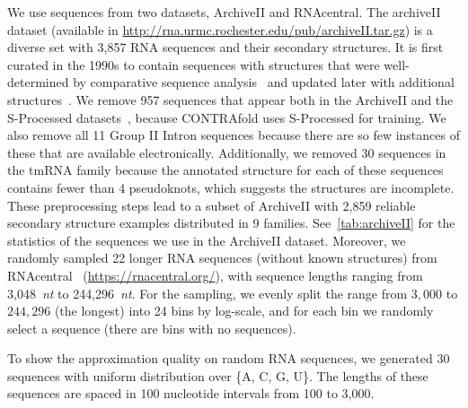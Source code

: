 We use sequences from two datasets, ArchiveII and RNAcentral.
The archiveII dataset 
(available in \url{http://rna.urmc.rochester.edu/pub/archiveII.tar.gz}) is %
a diverse set with 3,857 RNA sequences and their secondary structures.
It is first curated in the 1990s to contain sequences with structures that were well-determined by comparative sequence analysis~\cite{mathews+:1999}%
and updated later with additional structures~\cite{sloma+mathews:2016}. %
We remove 957 sequences that appear both in the ArchiveII and the S-Processed datasets~\cite{Andronescu+:2007}, 
because CONTRAfold uses S-Processed for training. 
We also remove all 11 Group II Intron sequences 
because there are so few instances of these that are available electronically.
Additionally, we removed 30 sequences in the tmRNA family because the annotated structure for each of these sequences contains fewer than 4 pseudoknots, 
which suggests the structures are incomplete. 
These preprocessing steps lead to a subset of ArchiveII with 2,859 reliable secondary structure 
examples 
distributed in 9 families. 
See~\ref{tab:archiveII} for the statistics of the sequences we use in the ArchiveII dataset.
Moreover, we randomly sampled 22 longer RNA sequences (without known structures) from RNAcentral~\cite{rnacentral:2017} 
(\url{https://rnacentral.org/}),
with sequence lengths ranging from 3,048~{\it nt} to 244,296~{\it nt}.
For the sampling, we evenly split the range from $3,000$ to $244,296$ (the longest) into 24 bins by log-scale, and for each bin we
randomly select a sequence (there are bins with
no sequences).

To show the approximation quality on random RNA sequences, 
we generated 30 sequences with uniform distribution over \{A, C, G, U\}.
The lengths of these sequences are spaced in 100 nucleotide intervals from 100 to 3,000.


